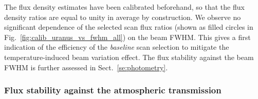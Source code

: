 \documentclass[traditionalabstract]{aa}
\newcommand{\lp}[1]{#1}
\begin{document}
The flux density estimates have been calibrated beforehand, so that
the flux density ratios are equal to unity in average by construction.
We observe no significant dependence of the selected scan flux ratios
(shown as filled circles in Fig.~\ref{fig:calib_uranus_vs_fwhm_all})
on the beam FWHM. {\lp This gives a first indication of the efficiency
  of the \emph{baseline} scan selection to mitigate the
temperature-induced beam variation effect. The flux stability against
the beam FWHM is further assessed in Sect.~\ref{se:photometry}.}


\subsubsection{Flux stability against the atmospheric transmission}
\label{se:baseline_calibration_atm}
\end{document}

